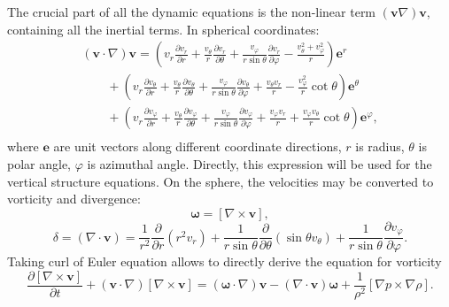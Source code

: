 \documentclass[usenatbib,onecolumn]{mnras}
\renewcommand{\vector}[1]{\ensuremath{\pmb{#1}}}
\newcommand{\pardir}[2]{\ensuremath{\frac{\partial #2}{\partial #1} }}
\newcommand{\ppardir}[2]{\ensuremath{\frac{\partial }{\partial #1} \left( #2\right)}}
\begin{document}
The crucial part of all the dynamic equations is the non-linear term
$(\vector{v}\nabla) \vector{v}$, containing all the inertial terms. In
spherical coordinates:
\begin{equation}\label{E:vdv}
  \begin{array}{l}
\displaystyle  (\vector{v}\cdot\nabla) \vector{v} = \left( v_r \pardir{r}{v_r} +
  \frac{v_\theta}{r} \pardir{\theta}{v_r} + \frac{v_\varphi}{r \sin
    \theta} \pardir{\varphi}{v_r} - \frac{v_\theta^2+v_\varphi^2}{r}\right)
  \vector{e}^r  \\
\displaystyle   \qquad{}   + \left( v_r \pardir{r}{v_\theta} + \frac{v_\theta}{r}\pardir{\theta}{v_\theta} +
  \frac{v_\varphi}{r\sin\theta} \pardir{\varphi}{v_\theta} + \frac{v_\theta
    v_r}{r} - \frac{v_\varphi^2}{r}\cot\theta\right) \vector{e}^\theta
   \\
\displaystyle   \qquad{}   +
   \left( v_r \pardir{r}{v_\varphi}  + 
   \frac{v_\theta}{r}\pardir{\theta}{v_\varphi} +
   \frac{v_\varphi}{r\sin\theta}\pardir{\varphi}{v_\varphi} + \frac{v_\varphi
     v_r}{r} + \frac{v_\varphi
     v_\theta}{r}\cot\theta\right) \vector{e}^\varphi,\\
   \end{array}
\end{equation}
where $\vector{e}$ are unit vectors along different coordinate directions, $r$
is radius, $\theta$ is polar angle, $\varphi$ is azimuthal
angle. Directly, this expression will be used for the vertical structure
equations. On the sphere, the velocities may be converted to
vorticity  and divergence:
\begin{equation}\label{E:vort}
  \displaystyle   \vector{\omega} = \left[ \nabla \times \vector{v}\right],
\end{equation}
\begin{equation}\label{E:div}
\displaystyle   \delta = (\nabla \cdot \vector{v}) = \frac{1}{r^2}\ppardir{r}{r^2v_r} +
  \frac{1}{r\sin \theta} \ppardir{\theta}{\sin \theta v_\theta} + \frac{1}{r\sin \theta}\pardir{\varphi}{v_\varphi} .
\end{equation}
Taking curl of Euler equation allows to directly derive the equation for
vorticity
\begin{equation}\label{E:Ecurl}
\displaystyle   \pardir{t}{\left[\nabla \times \vector{v}\right]} +
  (\vector{v}\cdot \nabla)\left[\nabla  \times \vector{v}\right] = (\vector{\omega} \cdot
\nabla) \vector{v} - (\nabla \cdot \vector{v}) \vector{\omega} +
  \frac{1}{\rho^2}\left[\nabla p \times \nabla \rho \right].
\end{equation}
\end{document}
